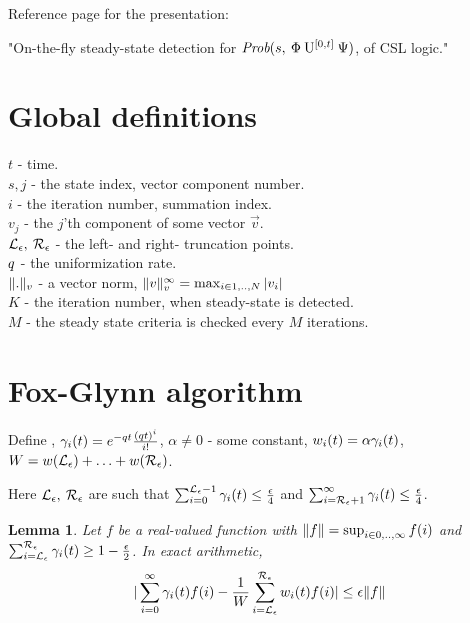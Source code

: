 \documentclass[twoside,a4paper,,10pt]{article}
\newtheorem{lemma}{Lemma}
\begin{document}
\begin{center}
	{\huge Reference page for the presentation:}
\end{center}
\begin{center}
	"On-the-fly steady-state detection for $\mbox{\it Prob}(s, \: \Phi \: \mathrm{U}^{[0,t]} \: \Psi )$, of CSL logic."
\end{center}
\section{Global definitions}
	$t$ - time.\\
	$s,j$ - the state index, vector component number.\\
	$i$ - the iteration number, summation index.\\
	$v_j$ - the $j$'th component of some vector $\vec{v}$.\\
	$\mathcal{L}_{\epsilon}, \: \mathcal{R}_{\epsilon}$ - the left- and right- truncation points.\\
	$q$ - the uniformization rate.\\
	$\lVert . \rVert_{v}$ - a vector norm, $\lVert  v  \rVert_{v}^{\infty} = \max_{i \in 1,..,N} |v_{i}|$\\
	$K$ - the iteration number, when steady-state is detected.\\
	$M$ - the steady state criteria is checked every $M$ iterations.

\section{Fox-Glynn algorithm}
	Define , $\gamma_{i}(t) = e^{-q t}\frac{\left( q t \right)^{i}}{i!} $, $\alpha \neq 0$ - some constant, $w_{i}(t) = \alpha \gamma_{i}(t)$, $W = w(\mathcal{L}_{\epsilon})+ \ldots + w(\mathcal{R}_{\epsilon})$.
	
	 Here $\mathcal{L}_{\epsilon}, \: \mathcal{R}_{\epsilon}$ are such that $\sum_{i=0}^{\mathcal{L}_{\epsilon}-1} \gamma_{i}(t) \leq \frac{\epsilon}{4}$ and $\sum_{i=\mathcal{R}_{\epsilon}+1}^{\infty} \gamma_{i}(t) \leq \frac{\epsilon}{4}$.
	\begin{lemma}
		Let $f$ be a real-valued function with $\|f\| = \sup_{i \in 0,..,\infty}f(i)$ and $\sum_{i=\mathcal{L}_{\epsilon}}^{\mathcal{R}_{\epsilon}} \gamma_{i}(t) \geq 1 - \frac{\epsilon}{2}$. In exact arithmetic,
		\begin{equation}
			| \sum_{i=0}^{\infty} \gamma_{i}(t) f(i) - \frac{1}{W}\sum_{i = \mathcal{L}_{\epsilon}}^{\mathcal{R}_{\epsilon}} w_{i}(t) f(i)| \leq \epsilon \|f\| \nonumber
		\end{equation}
	\end{lemma}
\end{document}
